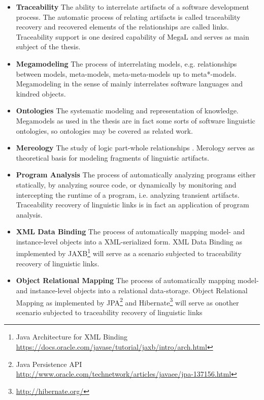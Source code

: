 \documentclass[runningheads,a4paper]{llncs}
\newcommand{\footnoteurl}[1]{\footnote{\url{#1}}}
\newcommand{\megal}{\text{MegaL}}
\begin{document}
\begin{itemize}

\item
\textbf{Traceability}
The ability to interrelate artifacts of a software development process.
The automatic process of relating artifacts is called traceability recovery and recovered elements of the relationships are called links.
Traceability support is one desired capability of $\megal$ and serves as main subject of the thesis.

\item
\textbf{Megamodeling}
The process of interrelating models, e.g. relationships between models, meta-models, meta-meta-models up to meta*-models.
Megamodeling in the sense of \megal mainly interrelates software languages and kindred objects.

\item
\textbf{Ontologies}
The systematic modeling and representation of knowledge.
Megamodels as used in the thesis are in fact some sorts of software linguistic ontologies, so ontologies may be covered as related work.

\item
\textbf{Mereology}
The study of logic part-whole relationships \cite{DBLP:journals/dke/Varzi96}.
Merology serves as theoretical basis for modeling fragments of linguistic artifacts.

\item
\textbf{Program Analysis}
The process of automatically analyzing programs either statically, by analyzing source code, or dynamically by monitoring and intercepting the runtime of a program, i.e. analyzing transient artifacts.
Traceability recovery of linguistic links is in fact an application of program analysis.

\item 
\textbf{XML Data Binding}
The process of automatically mapping model- and instance-level objects into a XML-serialized form.
XML Data Binding as  implemented by JAXB\footnote{Java Architecture for XML Binding \url{https://docs.oracle.com/javase/tutorial/jaxb/intro/arch.html}} will serve as a scenario subjected to traceability recovery of linguistic links.

\item
\textbf{Object Relational Mapping}
The process of automatically mapping model- and instance-level objects into a relational data-storage.
Object Relational Mapping as implemented by JPA\footnote{Java Persistence API \url{http://www.oracle.com/technetwork/articles/javaee/jpa-137156.html}} and Hibernate\footnoteurl{http://hibernate.org/} will serve as onother scenario subjected to traceability recovery of linguistic links


\end{itemize}
\end{document}
